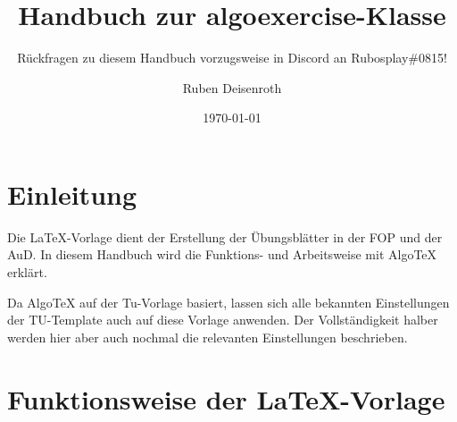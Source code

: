 \documentclass[
    titleprefix=AlgoTeX,
    inlineshortcut=java,
    corporatedesign,
    boxarc,
]{algoexercise}
\date{\today}
\author{Ruben Deisenroth}
\subtitle{Rückfragen zu diesem Handbuch vorzugsweise in Discord an Rubosplay\#0815!}
\title[Handbuch]{Handbuch zur algoexercise-Klasse}
\begin{document}


    \maketitle{}

    \tableofcontents{}


    \section{Einleitung}
    Die LaTeX-Vorlage dient der Erstellung der Übungsblätter in der FOP und der AuD. In diesem Handbuch wird die Funktions- und Arbeitsweise mit AlgoTeX erklärt.

    Da AlgoTeX auf der Tu-Vorlage basiert, lassen sich alle bekannten Einstellungen der TU-Template auch auf diese Vorlage anwenden. Der Vollständigkeit halber werden hier aber auch nochmal die relevanten Einstellungen beschrieben.
    \section{Funktionsweise der LaTeX-Vorlage}
\end{document}
